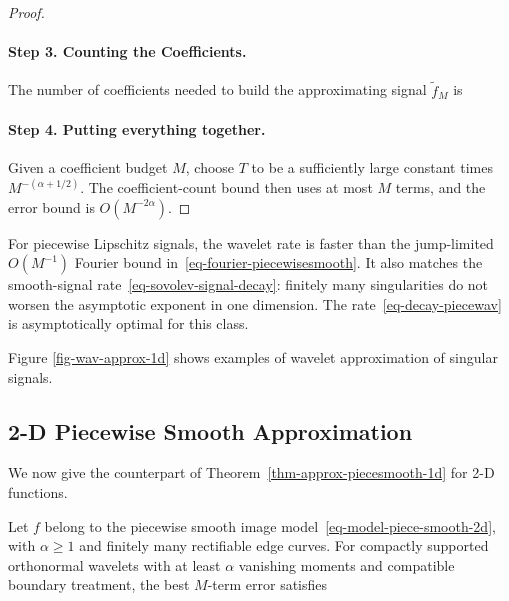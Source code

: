 \begin{proof}
  
\paragraph{Step 3. Counting the Coefficients.}
The number of coefficients needed to build the approximating signal $\tilde f_M$ is
  
\paragraph{Step 4. Putting everything together.}
Given a coefficient budget $M$, choose $T$ to be a sufficiently large constant times $M^{-(\alpha+1/2)}$. The coefficient-count bound then uses at most $M$ terms, and the error bound is $O(M^{-2\alpha})$.
\end{proof}

For piecewise Lipschitz signals, the wavelet rate is faster than the jump-limited $O(M^{-1})$ Fourier bound in~\eqref{eq-fourier-piecewisesmooth}. It also matches the smooth-signal rate~\eqref{eq-sovolev-signal-decay}: finitely many singularities do not worsen the asymptotic exponent in one dimension. The rate~\eqref{eq-decay-piecewav} is asymptotically optimal for this class.


Figure \ref{fig-wav-approx-1d} shows examples of wavelet approximation of singular signals. 


                                        
\subsection{2-D Piecewise Smooth Approximation}

We now give the counterpart of Theorem~\ref{thm-approx-piecesmooth-1d} for 2-D functions.

\begin{thm}\label{thm-approx-piecesmooth-2d}
Let $f$ belong to the piecewise smooth image model~\eqref{eq-model-piece-smooth-2d}, with $\alpha\geq1$ and finitely many rectifiable edge curves. For compactly supported orthonormal wavelets with at least $\alpha$ vanishing moments and compatible boundary treatment, the best $M$-term error satisfies
\end{thm}

